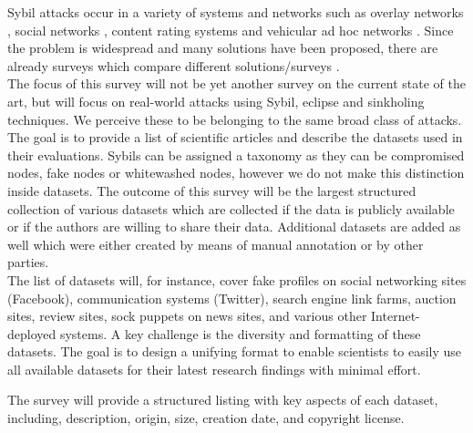 	Sybil attacks occur in a variety of systems and networks such as overlay networks \cite{singh2004defending}, social networks \cite{cao2014understanding, chiluka2012leveraging, mohaisen2011keep}, content rating systems \cite{kakhki11mitigating, tran2009sybil} and vehicular ad hoc networks \cite{park2009defense}.
	Since the problem is widespread and many solutions have been proposed, there are already surveys which compare different solutions/surveys \cite{koll2014state, mohaisen2013sybil, viswanath2011analysis}.\\
	The focus of this survey will not be yet another survey on the current state of the art, but will focus on real-world attacks using Sybil, eclipse and sinkholing techniques. 
	We perceive these to be belonging to the same broad class of attacks. 
	The goal is to provide a list of scientific articles and describe the datasets used in their evaluations.
	Sybils can be assigned a taxonomy as they can be compromised nodes, fake nodes \cite{newsome2004sybil} or whitewashed nodes, however we do not make this distinction inside datasets.  
	The outcome of this survey will be the largest structured collection of various datasets which are collected if the data is publicly available or if the authors are willing to share their data. Additional datasets are added as well which were either created by means of manual annotation or by other parties.\\
	The list of datasets will, for instance, cover fake profiles on social networking sites (Facebook), communication systems (Twitter), search engine link farms, auction sites, review sites, sock puppets on news sites, and various other Internet-deployed systems. 
	A key challenge is the diversity and formatting of these datasets. 
	The goal is to design a unifying format to enable scientists to easily use all available datasets for their latest research findings with minimal effort.
	
	The survey will provide a structured listing with key aspects of each dataset, including, description, origin, size, creation date, and copyright license.
